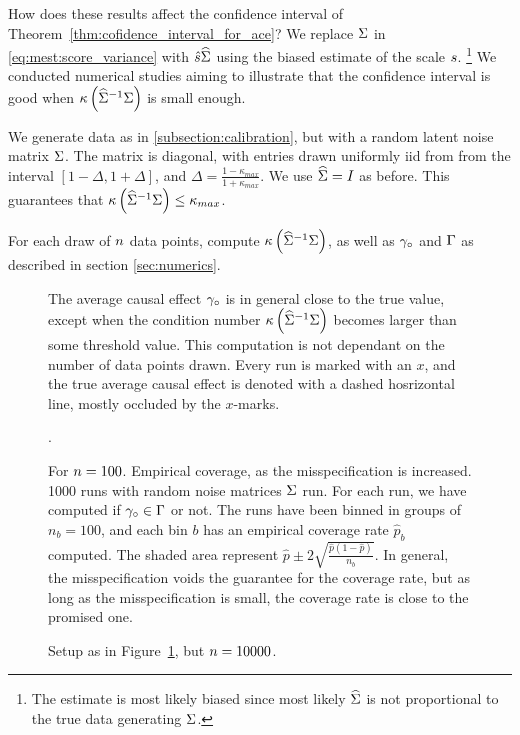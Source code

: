 How does these results affect the confidence interval of Theorem~\ref{thm:cofidence_interval_for_ace}? We replace $\Sigma $ in \eqref{eq:mest:score_variance} with $\hat {s} \widehat{\Sigma}$ using the biased estimate of the scale $s$.
\footnote{The estimate is most likely biased since most likely $\widehat{\Sigma}$ is not proportional to the true data generating $\Sigma$.}
We conducted numerical studies aiming to illustrate that the confidence interval is good when $\kappa\left(\widehat{\Sigma}^{-1}\Sigma\right)$ is small enough. 

We generate data as in \ref{subsection:calibration}, but with a random latent noise matrix $\Sigma$. The matrix is diagonal, with entries drawn uniformly iid from from the interval $[1-\Delta,1+\Delta]$, and $\Delta=\frac{1-\kappa_{max}}{1+\kappa_{max}}$. We use $\widehat{\Sigma}=I$ as before. This guarantees that $\kappa\left(\widehat{\Sigma}^{-1}\Sigma\right) \leq \kappa_{max}$.

For each draw of $n$ data points, compute $\kappa\left(\widehat{\Sigma}^{-1}\Sigma\right)$, as well as $\gamma_\circ$ and $\Gamma$ as described in section \ref{sec:numerics}.

\begin{figure}
    \centering
    
    \caption{The average causal effect $\gamma_\circ$ is in general close to the true value, except when the condition number $\kappa\left(\widehat{\Sigma}^{-1}\Sigma\right)$ becomes larger than some threshold value. This computation is not dependant on the number of data points drawn. Every run is marked with an $x$, and the true average causal effect is denoted with a dashed hosrizontal line, mostly occluded by the $x$-marks.}
\end{figure}

\begin{figure}
    \centering
    
    \caption{For $n=100$. Empirical coverage, as the misspecification is increased. 1000 runs with random noise matrices $\Sigma$ run. For each run, we have computed if $\gamma_\circ \in \Gamma$ or not. The runs have been binned in groups of $n_b=100$, and each bin $b$ has an empirical coverage rate $\hat p_b$ computed. The shaded area represent $\hat p \pm 2\sqrt{\frac{\hat p(1-\hat p)}{n_b}}$. In general, the misspecification voids the guarantee for the coverage rate, but as long as the misspecification is small, the coverage rate is close to the promised one. } \label{fig:misspec coverage 100}.
\end{figure}


\begin{figure}
    \centering
    
    \caption{Setup as in Figure~\ref{fig:misspec coverage 100}, but $n=10000$.}
\end{figure}

